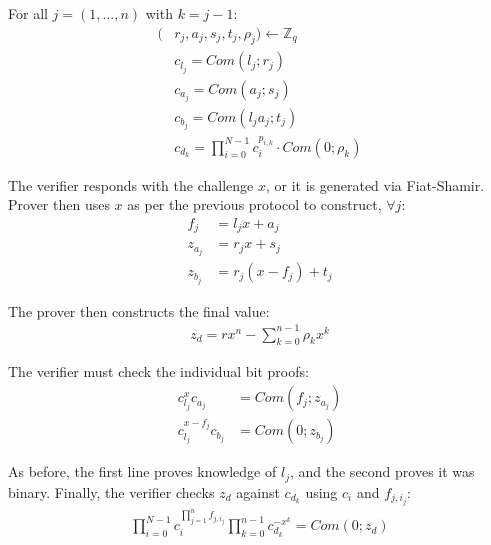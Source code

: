 \documentclass{article}
\begin{document}
For all $j = (1, ..., n)$ with $k = j - 1$:
\begin{align}
  (&r_j, a_j, s_j, t_j, \rho_j) \longleftarrow \mathbb{Z}_q\\
  &c_{l_j} = Com(l_j; r_j)\\
  &c_{a_j} = Com(a_j; s_j)\\
  &c_{b_j} = Com(l_j a_j; t_j)\\
  &c_{d_k} = \prod_{i=0}^{N-1}{c_i^{p_{i,k}}} \cdot Com(0; \rho_k)
\end{align}

The verifier responds with the challenge $x$, or it is generated via Fiat-Shamir.  Prover then uses $x$ as per the previous protocol to construct, $\forall j$:
\begin{align}
  f_j &= l_j x + a_j\\
  z_{a_j} &= r_j x + s_j\\
  z_{b_j} &= r_j (x - f_j) + t_j
\end{align}

The prover then constructs the final value:
\begin{align}
  z_d = r x^n - \sum_{k=0}^{n-1}{\rho_k x^k}
\end{align}

The verifier must check the individual bit proofs:
\begin{align}
  c_{l_j}^x c_{a_j} &= Com(f_j; z_{a_j})\\
  c_{l_j}^{x-f_j} c_{b_j} &= Com(0; z_{b_j})
\end{align}
    
As before, the first line proves knowledge of $l_j$, and the second proves it was binary.  Finally, the verifier checks $z_d$ against $c_{d_k}$ using $c_i$ and $f_{j,i_j}$:
\begin{align}
  \prod_{i=0}^{N-1}{c_i^{\prod_{j=1}^{n}{f_{j,i_j}}}} \prod_{k=0}^{n-1}{c_{d_k}^{-x^k}} = Com(0; z_d)
\end{align}
\end{document}
